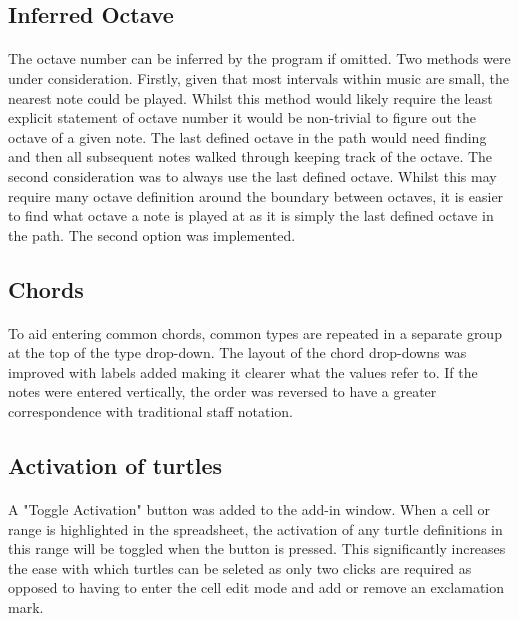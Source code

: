 \subsection{Inferred Octave}

\paragraph{} The octave number can be inferred by the program if omitted. Two methods were under consideration. Firstly, given that most intervals within music are small, the nearest note could be played.
Whilst this method would likely require the least explicit statement of octave number it would be non-trivial to figure out the octave of a given note. The last defined octave in the path would need finding and then all subsequent notes walked through keeping track of the octave. The second consideration was to always use the last defined octave. Whilst this may require many octave definition around the boundary between octaves, it is easier to find what octave a note is played at as it is simply the last defined octave in the path. The second option was implemented.

\subsection{Chords}

\paragraph{} To aid entering common chords, common types are repeated in a separate group at the top of the type drop-down. The layout of the chord drop-downs was improved with labels added making it clearer what the values refer to. If the notes were entered vertically, the order was reversed to have a greater correspondence with traditional staff notation.

\subsection{Activation of turtles}

\paragraph{} A "Toggle Activation" button was added to the add-in window. When a cell or range is highlighted in the spreadsheet, the activation of any turtle definitions in this range will be toggled when the button is pressed.  This significantly increases the ease with which turtles can be seleted as only two clicks are required as opposed to having to enter the cell edit mode and add or remove an exclamation mark.

